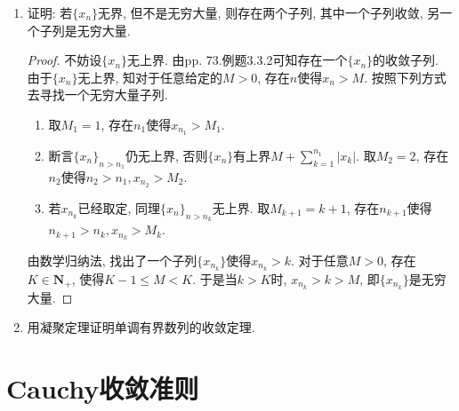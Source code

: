\documentclass[a4paper,11pt,twoside]{ctexbook}
\begin{document}
\begin{enumerate}
\begin{proof}
		      必要性. 若有界数列$\{x_n\}$发散. 由Weierstrass定理, 存在一个收敛子列$\{x_{n_l}\}$, 记其极限为$A$. 由于$\{x_n\}$不收敛于$A$, 故存在$\varepsilon_0>0$, 对于任意$N>0$, 存在$n>N$使得$|x_n-A|\geqslant\varepsilon$.

		      对于$N_1=1$, 存在$k_1>N_1$使得$|x_{k_1}-A|\geqslant\varepsilon_0$;

		      对于$N_2=k_1$, 存在$k_2>N_2$使得$|x_{k_2}-A|\geqslant\varepsilon_0$;

		      若$x_{k_n}$已经取定, 对于$N_{n+1}=k_n$, 存在$k_{n+1}>N_{k+1}$使得$|x_{k_{n+1}}-A|\geqslant\varepsilon_0$.

		      由数学归纳法, 找出了一个有界数列$\{x_n\}$的子列$\{x_{k_n}\}$, 因而仍是有界数列, 由Weierstrass定理, 存在一个收敛子列, 记为$\{x_{n_m}\}$. 注意对于$\forall m\in\mathbf{N}_{+}$, $|x_{n_m}-A|\geqslant\varepsilon_0$, 故$\lim\limits_{m\to\infty} x_{n_m}\neq A$. 从而$\{x_{n_l}\}$和$\{x_{n_m}\}$是$\{x_n\}$的收敛于不同极限的两个子列. \qedhere
	      \end{proof}

	\item 证明: 若$\{x_n\}$无界, 但不是无穷大量, 则存在两个子列, 其中一个子列收敛, 另一个子列是无穷大量.
	      \begin{proof}
		      不妨设$\{x_n\}$无上界. 由pp. 73.例题3.3.2可知存在一个$\{x_n\}$的收敛子列.
		      由于$\{x_n\}$无上界, 知对于任意给定的$M>0$, 存在$n$使得$x_n>M$. 按照下列方式去寻找一个无穷大量子列.
		      \begin{enumerate}[(1)]
			      \item 取$M_1=1$, 存在$n_1$使得$x_{n_1}>M_1$.
			      \item 断言$\{x_n\}_{n>n_1}$仍无上界, 否则$\{x_n\}$有上界$M+\sum\limits_{k=1}^{n_1} |x_k|$. 取$M_2=2$, 存在$n_2$使得$n_2>n_1, x_{n_2}>M_2$.
			      \item 若$x_{n_k}$已经取定, 同理$\{x_n\}_{n>n_k}$无上界. 取$M_{k+1}=k+1$, 存在$n_{k+1}$使得$n_{k+1}>n_k, x_{n_k}>M_k$.
		      \end{enumerate}
		      由数学归纳法, 找出了一个子列$\{x_{n_k}\}$使得$x_{n_k}>k$. 对于任意$M>0$, 存在$K\in\mathbf{N}_{+}$, 使得$K-1\leqslant M<K$. 于是当$k>K$时, $x_{n_k}>k>M$, 即$\{x_{n_k}\}$是无穷大量. \qedhere
	      \end{proof}

	\item 用凝聚定理证明单调有界数列的收敛定理.
\end{enumerate}

\section{Cauchy收敛准则}
\end{document}

